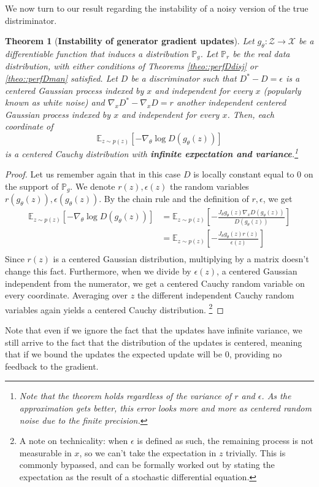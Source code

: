 \documentclass{article} %
\newcommand\EE{\mathbb{E}}
\newcommand\PP{\mathbb{P}}
\newtheorem{theo}{Theorem}[section]
\theoremstyle{definition}
\begin{document}
We now turn to our result regarding the instability of a noisy version of the true distriminator.
\begin{theo}[\textbf{Instability of generator gradient updates}]
Let $g_\theta: \mathcal{Z} \rightarrow \mathcal{X}$ be a differentiable
function that induces a distribution $\PP_g$. Let $\PP_r$ be the real data distribution, with
either conditions of Theorems \autoref{theo::perfDdisj} or \autoref{theo::perfDman} satisfied.
Let $D$ be a discriminator such that $D^* - D = \epsilon$ is a centered Gaussian 
process indexed by $x$ and independent for every $x$ (popularly known as white noise)
and $\nabla_x D^* - \nabla_xD = r$ another independent centered Gaussian process indexed by
$x$ and independent for every $x$. Then, each coordinate of
$$ \EE_{z \sim p(z)} \left[ -\nabla_\theta \log D(g_\theta(z))\right] $$
is a centered Cauchy distribution with \textbf{infinite expectation and variance}.\footnote{Note
that the theorem holds regardless of the variance of $r$ and $\epsilon$. As the approximation
gets better, this error looks more and more as centered random noise due to the finite precision.}
\end{theo}
\begin{proof}
Let us remember again that in this case $D$ is locally constant equal to 0 on the support of $\PP_g$.
We denote $r(z), \epsilon(z)$ the random variables $r(g_\theta(z)), \epsilon(g_\theta(z))$.
By the chain rule and the definition of $r, \epsilon$, we get
\begin{align*}
  \EE_{z \sim p(z)} \left[ -\nabla_\theta \log D(g_\theta(z)) \right] &= 
    \EE_{z \sim p(z)} \left[ -\frac{J_\theta g_\theta(z) \nabla_x D(g_\theta(z))}
    {D(g_\theta(z))} \right] \\
  &= \EE_{z \sim p(z)} \left[ -\frac{J_\theta g_\theta(z) r(z)}
    {\epsilon(z)} \right] \\
\end{align*}
Since $r(z)$ is a centered Gaussian distribution, multiplying by a matrix doesn't change this
fact. Furthermore, when we divide by $\epsilon(z)$, a centered
Gaussian independent from the numerator, we get a centered Cauchy random variable on every
coordinate. Averaging
over $z$ the different independent Cauchy random variables again yields 
a centered Cauchy distribution.
\footnote{A note on technicality: when $\epsilon$ is defined as such, the remaining
process is not measurable in $x$, so we can't take the expectation in $z$ trivially.
This is commonly bypassed, and can be formally worked out
by stating the expectation as the result of a stochastic differential equation.}
\end{proof}
Note that even if we ignore the fact that the updates have infinite variance, we still arrive
to the fact that the distribution of the updates is centered, meaning that if we bound the updates
the expected update will be 0, providing no feedback to the gradient.
\end{document}
